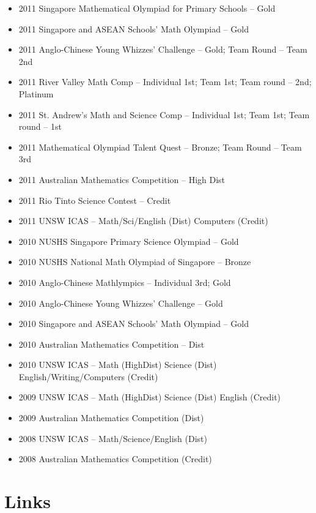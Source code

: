 \documentclass{article}
\begin{document}
{\begin{itemize}
\begin{itemize}
        \item 2011 Singapore Mathematical Olympiad for Primary Schools -- Gold
        \item 2011 Singapore and ASEAN Schools' Math Olympiad -- Gold
        \item 2011 Anglo-Chinese Young Whizzes' Challenge -- Gold; Team Round -- Team 2nd
        \item 2011 River Valley Math Comp -- Individual 1st; Team 1st; Team round -- 2nd; Platinum
        \item 2011 St. Andrew's Math and Science Comp -- Individual 1st; Team 1st; Team round -- 1st
        \item 2011 Mathematical Olympiad Talent Quest -- Bronze; Team Round -- Team 3rd
        \item 2011 Australian Mathematics Competition -- High Dist
        \item 2011 Rio Tinto Science Contest -- Credit
        \item 2011 UNSW ICAS -- Math/Sci/English (Dist) Computers (Credit)
        \item 2010 NUSHS Singapore Primary Science Olympiad -- Gold
        \item 2010 NUSHS National Math Olympiad of Singapore -- Bronze
        \item 2010 Anglo-Chinese Mathlympics -- Individual 3rd; Gold
        \item 2010 Anglo-Chinese Young Whizzes' Challenge -- Gold
        \item 2010 Singapore and ASEAN Schools' Math Olympiad -- Gold
        \item 2010 Australian Mathematics Competition -- Dist
        \item 2010 UNSW ICAS -- Math (HighDist) Science (Dist) English/Writing/Computers (Credit)
        \item 2009 UNSW ICAS -- Math (HighDist) Science (Dist) English (Credit)
        \item 2009 Australian Mathematics Competition (Dist)
        \item 2008 UNSW ICAS -- Math/Science/English (Dist)
        \item 2008 Australian Mathematics Competition (Credit)
    \end{itemize}
\end{itemize}

}


\section*{Links}
\end{document}
